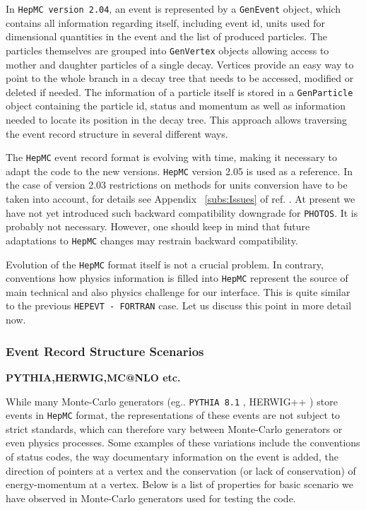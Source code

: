 \documentclass[]{Photos_interface_design}
\begin{document}
In {\tt HepMC version 2.04}, an  event is represented by a {\tt GenEvent} object,
which contains all information regarding itself, including event id,
units used for dimensional quantities in the event and the list of produced particles. The particles
themselves are grouped into {\tt GenVertex} objects allowing access to mother
and daughter particles of a single decay. Vertices provide an easy way
to point to the whole branch in a decay tree that needs to be accessed,
modified or deleted if needed. The information of a particle  itself is stored
in a {\tt GenParticle} object containing the particle id, status and momentum
as well as information needed to locate its position in the decay tree.
This approach allows traversing the event record structure in several different
ways.

The {\tt HepMC} event record format is  evolving with time, making it necessary
 to adapt
the code to the new versions.
{\tt HepMC} version 2.05 is used as a reference. In the case of version 2.03 restrictions on methods for 
units
conversion have to be taken into account, for details see Appendix ~\ref{subs:Issues}
of ref. \cite{Davidson:2010rw}. At present we have not yet introduced such 
backward compatibility downgrade for {\tt PHOTOS}. It is probably not necessary.
However,
one should keep in mind that future adaptations to {\tt HepMC} changes may restrain
backward compatibility.

Evolution of the {\tt HepMC} format itself is not a crucial problem.
In contrary, conventions how physics information is  filled into {\tt HepMC}
 represent the source of main technical and also physics 
challenge for our interface. 
This is quite similar to the previous
{\tt HEPEVT - FORTRAN} case. Let us discuss this point in more detail now.

\subsubsection{Event Record Structure Scenarios}

{\bf PYTHIA,HERWIG,MC@NLO etc. }

While many Monte-Carlo generators (eg.. {\tt PYTHIA 8.1} \cite{Sjostrand:2007gs}, 
HERWIG++ \cite{Bahr:2008pv})
store events in {\tt HepMC} format, the  representations of
these events are not subject to strict standards,  which can therefore
vary between Monte-Carlo generators or even physics processes. Some examples
of these variations include the conventions of status codes, the  way
documentary information on the event is added, the direction of pointers at a vertex
and the conservation (or lack of conservation) of energy-momentum at a vertex.
Below is a list of properties for basic scenario we have observed in Monte-Carlo
generators used for testing the code.
\end{document}
